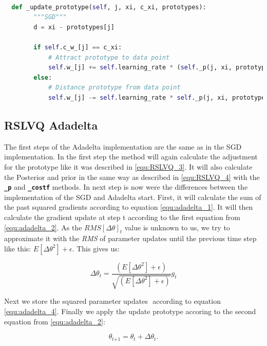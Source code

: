 \documentclass[12pt,oneside,a4paper,parskip]{scrbook}
\begin{document}
\begin{lstlisting}[label=lst:sgd,
  language=python,
  firstnumber=1,
  caption= Method \texttt{\_update\_prototype} as it was used in \cite{PassiveDriftonRSLVQ}.]			   

  def _update_prototype(self, j, xi, c_xi, prototypes):
        """SGD"""
        d = xi - prototypes[j]

        if self.c_w_[j] == c_xi:
            # Attract prototype to data point
            self.w_[j] += self.learning_rate * (self._p(j, xi, prototypes=self.w_, y=c_xi) -  self._p(j, xi, prototypes=self.w_)) * d
        else:
            # Distance prototype from data point
            self.w_[j] -= self.learning_rate * self._p(j, xi, prototypes=self.w_) * d
\end{lstlisting}

\subsection{RSLVQ Adadelta}

The first steps of the Adadelta implementation are the same as in the SGD implementation. In the first step the method will
again calculate the adjustment for the prototype like it was described in \ref{equ:RSLVQ_3}.
It will also calculate the Posterior and prior in the same way as described in \ref{equ:RSLVQ_4} with the \textbf{\texttt{\_p}} and
\textbf{\texttt{\_costf}} methods.
In next step is now were the differences between the implementation of the SGD and Adadelta start.
First, it will calculate the sum of the past squared gradients according to equation \ref{equ:adadelta_1}.
It will then calculate the gradient update at step t according to the first equation from \ref{equ:adadelta_2}.
As the $\textit{RMS}[\Delta\theta]_t$ value is unknown to us, we try to approximate it with the \textit{RMS} of 
parameter updates until the previous time step like this: $E[\Delta\theta^2] + \epsilon$.
This gives us:

\begin{equation}
  \Delta \theta_t = \frac{(E[\Delta\theta^2] + \epsilon)}{\sqrt{(E[\Delta\theta^2] + \epsilon)}} g_t
\end{equation}

Next we store the squared parameter updates $ $ according to equation \ref{equ:adadelta_4}.
Finally we apply the update prototype accoring to the second equation from \ref{equ:adadelta_2}:

\begin{equation}
  \theta_\textit{t+1} = \theta_t + \Delta\theta_t.
\end{equation}
\end{document}
